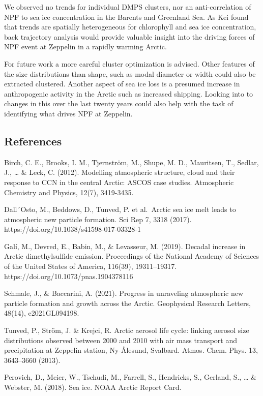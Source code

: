 \documentclass[11pt]{article}
\begin{document}
We observed no trends for individual DMPS clusters, nor an
anti-correlation of NPF to sea ice concentration in the Barents and
Greenland Sea. As Kei found that trends are spatially heterogeneous for
chlorophyll and sea ice concentration, back trajectory analysis would
provide valuable insight into the driving forces of NPF event at
Zeppelin in a rapidly warming Arctic.

For future work a more careful cluster optimization is advised. Other
features of the size distributions than shape, such as modal diameter or
width could also be extracted clustered. Another aspect of sea ice loss
is a presumed increase in anthropogenic activity in the Arctic such as
increased shipping. Looking into to changes in this over the last twenty
years could also help with the task of identifying what drives NPF at
Zeppelin.

    \hypertarget{references}{%
\subsection{References}\label{references}}

Birch, C. E., Brooks, I. M., Tjernström, M., Shupe, M. D., Mauritsen,
T., Sedlar, J., \ldots{} \& Leck, C. (2012). Modelling atmospheric
structure, cloud and their response to CCN in the central Arctic: ASCOS
case studies. Atmospheric Chemistry and Physics, 12(7), 3419-3435.

Dall´Osto, M., Beddows, D., Tunved, P. et al.~Arctic sea ice melt leads
to atmospheric new particle formation. Sci Rep 7, 3318 (2017).
https://doi.org/10.1038/s41598-017-03328-1

Galí, M., Devred, E., Babin, M., \& Levasseur, M. (2019). Decadal
increase in Arctic dimethylsulfide emission. Proceedings of the National
Academy of Sciences of the United States of America, 116(39),
19311--19317. https://doi.org/10.1073/pnas.1904378116

Schmale, J., \& Baccarini, A. (2021). Progress in unraveling atmospheric
new particle formation and growth across the Arctic. Geophysical
Research Letters, 48(14), e2021GL094198.

Tunved, P., Ström, J. \& Krejci, R. Arctic aerosol life cycle: linking
aerosol size distributions observed between 2000 and 2010 with air mass
transport and precipitation at Zeppelin station, Ny-Ålesund, Svalbard.
Atmos. Chem. Phys. 13, 3643--3660 (2013).

Perovich, D., Meier, W., Tschudi, M., Farrell, S., Hendricks, S.,
Gerland, S., \ldots{} \& Webster, M. (2018). Sea ice. NOAA Arctic Report
Card.


    
    
    
\end{document}
